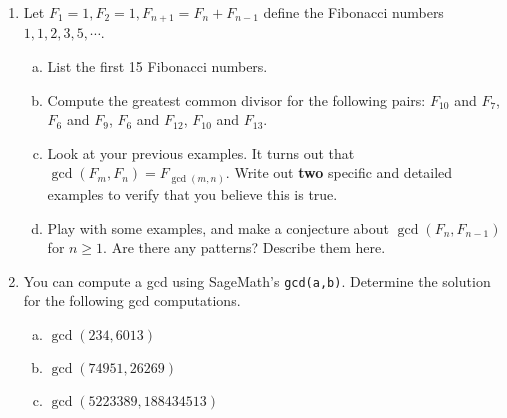 \documentclass[12pt]{amsart}
\theoremstyle{plain}
\theoremstyle{definition}
\begin{document}
\begin{enumerate}[1.]
	\item Let $F_1 = 1, F_2 = 1, F_{n+1} = F_n + F_{n-1}$ define the Fibonacci numbers $1,1,2,3,5, \cdots$.
		\begin{enumerate}[a.]
			\item List the first 15 Fibonacci numbers.
				\begin{framed}
				\vspace{2in}
				\end{framed}
			\item Compute the greatest common divisor for the following pairs: $F_{10}$ and $F_7$, $F_6$ and $F_9$, $F_6$ and $F_{12}$, $F_{10}$ and $F_{13}$.
				\begin{framed}
				\vspace{1.8in}
				\end{framed}
			\item Look at your previous examples. It turns out that $\gcd(F_m,F_n) = F_{\gcd(m,n)}$.  Write out \textbf{two} specific and detailed examples to verify that you believe this is true.
			\begin{framed}
				\vspace{1.3in}
			\end{framed}
			\begin{framed}
				\vspace{1.3in}
			\end{framed}
			\item Play with some examples, and make a conjecture about $\gcd(F_n,F_{n-1})$ for $n \geq 1$.  Are there any patterns?  Describe them here.
			\begin{framed}
				\vspace{2in}
			\end{framed}
		\end{enumerate}
	\item You can compute a gcd using SageMath's \texttt{gcd(a,b)}.  Determine the solution for the following gcd computations.
		\begin{enumerate}[a.]
			\item $\gcd(234,6013)$
			\begin{framed}
			\vspace{1in}
			\end{framed}
			\newpage\item $\gcd(74951,26269)$
			\begin{framed}
			\vspace{1in}
			\end{framed}
			\item $\gcd(5223389,188434513)$

\end{enumerate}
\end{enumerate}
\end{document}
